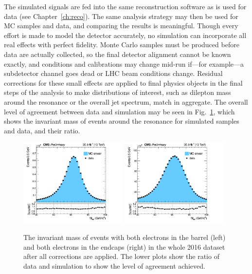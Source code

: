 The simulated signals are fed into the same reconstruction software as is used for data (see Chapter~\ref{ch:reco}).
The same analysis strategy may then be used for MC samples and data, and comparing the results is meaningful.
Though every effort is made to model the detector accurately, no simulation can incorporate all real effects with perfect fidelity.
Monte Carlo samples must be produced before data are actually collected, so the final detector alignment cannot be known exactly, and conditions and calibrations may change mid-run if---for example---a subdetector channel goes dead or LHC beam conditions change.
Residual corrections for these small effects are applied to final physics objects in the final steps of the analysis to make distributions of interest, such as dilepton mass around the {\PZ} resonance or the overall jet {\pt} spectrum, match in aggregate.
The overall level of agreement between data and simulation may be seen in Fig.~\ref{fig:dataMCRatio}, which shows the invariant mass of {\epem} events around the {\PZ} resonance for simulated samples and data, and their ratio.

\begin{figure}[htbp]
  \begin{center}
    \includegraphics[width=0.48\textwidth]{simulation/EBEBInvMass2016.png}
    \includegraphics[width=0.48\textwidth]{simulation/EEEEInvMass2016.png}
    \caption[Comparison of data and simulation in {\epem} events around the {\PZ} resonance]{
        The invariant mass of {\epem} events with both electrons in the barrel (left) and both electrons in the endcaps (right) in the whole 2016 dataset after all corrections are applied.
        The lower plots show the ratio of data and simulation to show the level of agreement achieved.
      }\label{fig:dataMCRatio}
  \end{center}
\end{figure}
